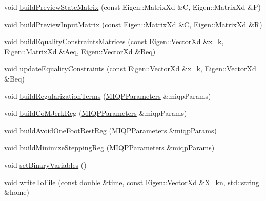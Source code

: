 \begin{DoxyCompactItemize}
\item 
void \hyperlink{classMIQPController_ad9a2e7d2c658937c847097f83d3408e3}{build\-Preview\-State\-Matrix} (const \-Eigen\-::\-Matrix\-Xd \&\-C, \-Eigen\-::\-Matrix\-Xd \&\-P)
\item 
void \hyperlink{classMIQPController_a9e4f007d1b6b7f68582aebbc09cf0813}{build\-Preview\-Input\-Matrix} (const \-Eigen\-::\-Matrix\-Xd \&\-C, \-Eigen\-::\-Matrix\-Xd \&\-R)
\item 
void \hyperlink{classMIQPController_a870c7d3c0e5fcfd46f7bb95924007082}{build\-Equality\-Constraints\-Matrices} (const \-Eigen\-::\-Vector\-Xd \&x\-\_\-k, \-Eigen\-::\-Matrix\-Xd \&\-Aeq, \-Eigen\-::\-Vector\-Xd \&\-Beq)
\item 
void \hyperlink{classMIQPController_a4c3f665528fae6c051160456692372ee}{update\-Equality\-Constraints} (const \-Eigen\-::\-Vector\-Xd \&x\-\_\-k, \-Eigen\-::\-Vector\-Xd \&\-Beq)
\item 
void \hyperlink{classMIQPController_a973c28f80d04db7cdbdced07e1eeda16}{build\-Regularization\-Terms} (\hyperlink{structMIQPParameters}{\-M\-I\-Q\-P\-Parameters} \&miqp\-Params)
\item 
void \hyperlink{classMIQPController_ac458316007d11e4b592cfb2e227bad69}{build\-Co\-M\-Jerk\-Reg} (\hyperlink{structMIQPParameters}{\-M\-I\-Q\-P\-Parameters} \&miqp\-Params)
\item 
void \hyperlink{classMIQPController_ad18d82e49c5508dc0239c21a85809131}{build\-Avoid\-One\-Foot\-Rest\-Reg} (\hyperlink{structMIQPParameters}{\-M\-I\-Q\-P\-Parameters} \&miqp\-Params)
\item 
void \hyperlink{classMIQPController_af721e438de3208adc893abe78551a0cb}{build\-Minimize\-Stepping\-Reg} (\hyperlink{structMIQPParameters}{\-M\-I\-Q\-P\-Parameters} \&miqp\-Params)
\item 
void \hyperlink{classMIQPController_afce6feca593352323e052b6c993cbf69}{set\-Binary\-Variables} ()
\item 
void \hyperlink{classMIQPController_a014cab392ddec6085df74f2590af4791}{write\-To\-File} (const double \&time, const \-Eigen\-::\-Vector\-Xd \&\-X\-\_\-kn, std\-::string \&home)
\end{DoxyCompactItemize}
